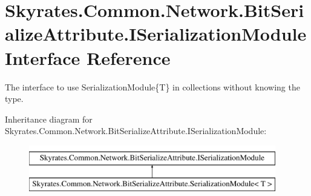 \hypertarget{interface_skyrates_1_1_common_1_1_network_1_1_bit_serialize_attribute_1_1_i_serialization_module}{\section{Skyrates.\-Common.\-Network.\-Bit\-Serialize\-Attribute.\-I\-Serialization\-Module Interface Reference}
\label{interface_skyrates_1_1_common_1_1_network_1_1_bit_serialize_attribute_1_1_i_serialization_module}
}


The interface to use Serialization\-Module\{\-T\} in collections without knowing the type.  


Inheritance diagram for Skyrates.\-Common.\-Network.\-Bit\-Serialize\-Attribute.\-I\-Serialization\-Module\-:\begin{figure}[H]
\begin{center}
\leavevmode
\includegraphics[height=2.000000cm]{interface_skyrates_1_1_common_1_1_network_1_1_bit_serialize_attribute_1_1_i_serialization_module}
\end{center}
\end{figure}
